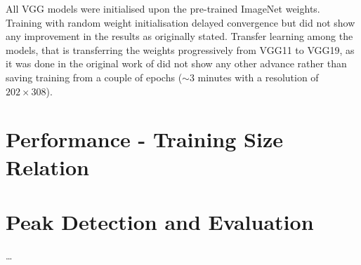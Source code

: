 All VGG models were initialised upon the pre-trained ImageNet weights. Training with random weight initialisation delayed convergence but did not show any improvement in the results as \cite{bargoti2017deep} originally stated. Transfer learning among the models, that is transferring the weights progressively from VGG11 to VGG19, as it was done in the original work of \cite{simonyan2014very} did not show any other advance rather than saving training from a couple of epochs ($\sim3$ minutes with a resolution of $202\times308$).


\section{Performance - Training Size Relation}

\section{Peak Detection and Evaluation}

\dots